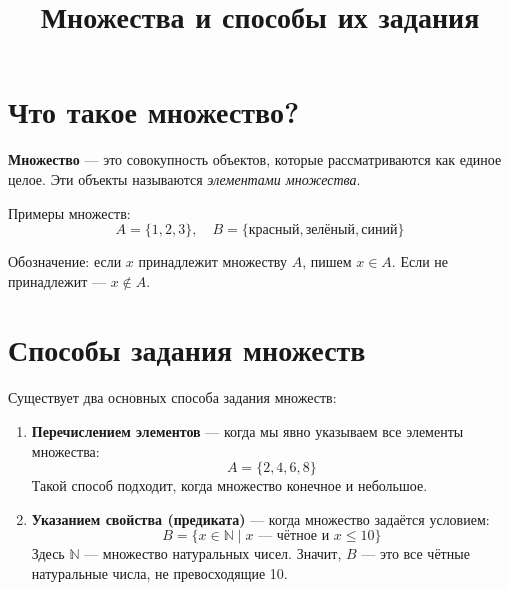 \documentclass{article}
\begin{document}
\title{Множества и способы их задания}
\author{}
\date{}
\makeatletter
\renewcommand{\maketitle}{
  \begin{center}
    {\Large\mdseries %
     \@title \par}
    \vspace{0em}
  \end{center}
}
\makeatother
\maketitle

\section*{Что такое множество?}

\textbf{Множество} — это совокупность объектов, которые рассматриваются как единое целое. Эти объекты называются \textit{элементами множества}.

Примеры множеств:
\[
A = \{1, 2, 3\}, \quad B = \{\text{красный}, \text{зелёный}, \text{синий}\}
\]

Обозначение: если $x$ принадлежит множеству $A$, пишем $x \in A$. Если не принадлежит — $x \notin A$.

\section*{Способы задания множеств}

Существует два основных способа задания множеств:

\begin{enumerate}[label=\arabic*)]
  \item \textbf{Перечислением элементов} — когда мы явно указываем все элементы множества:
  \[
  A = \{2, 4, 6, 8\}
  \]
  Такой способ подходит, когда множество конечное и небольшое.

  \item \textbf{Указанием свойства (предиката)} — когда множество задаётся условием:
  \[
  B = \{x \in \mathbb{N} \mid x \text{ — чётное и } x \leq 10\}
  \]
  Здесь $\mathbb{N}$ — множество натуральных чисел. Значит, $B$ — это все чётные натуральные числа, не превосходящие 10.
\end{enumerate}
\end{document}
